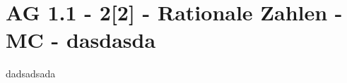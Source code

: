\section{AG 1.1 - 2[2] - Rationale Zahlen - MC - dasdasda}

\begin{beispiel}[AG 1.1]{1}
dadsadsada
\end{beispiel}
